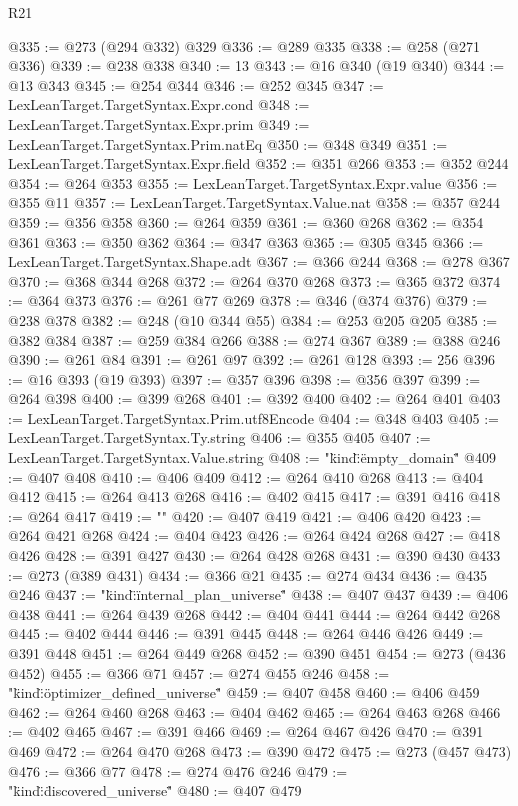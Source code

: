 \begin{lexlean}{R21}
\begin{coremodule}
@335 := @273 (@294 @332) @329
@336 := @289 @335
@338 := @258 (@271 @336)
@339 := @238 @338
@340 := 13
@343 := @16 @340 (@19 @340)
@344 := @13 @343
@345 := @254 @344
@346 := @252 @345
@347 := LexLeanTarget.TargetSyntax.Expr.cond
@348 := LexLeanTarget.TargetSyntax.Expr.prim
@349 := LexLeanTarget.TargetSyntax.Prim.natEq
@350 := @348 @349
@351 := LexLeanTarget.TargetSyntax.Expr.field
@352 := @351 @266
@353 := @352 @244
@354 := @264 @353
@355 := LexLeanTarget.TargetSyntax.Expr.value
@356 := @355 @11
@357 := LexLeanTarget.TargetSyntax.Value.nat
@358 := @357 @244
@359 := @356 @358
@360 := @264 @359
@361 := @360 @268
@362 := @354 @361
@363 := @350 @362
@364 := @347 @363
@365 := @305 @345
@366 := LexLeanTarget.TargetSyntax.Shape.adt
@367 := @366 @244
@368 := @278 @367
@370 := @368 @344 @268
@372 := @264 @370 @268
@373 := @365 @372
@374 := @364 @373
@376 := @261 @77 @269
@378 := @346 (@374 @376)
@379 := @238 @378
@382 := @248 (@10 @344 @55)
@384 := @253 @205 @205
@385 := @382 @384
@387 := @259 @384 @266
@388 := @274 @367
@389 := @388 @246
@390 := @261 @84
@391 := @261 @97
@392 := @261 @128
@393 := 256
@396 := @16 @393 (@19 @393)
@397 := @357 @396
@398 := @356 @397
@399 := @264 @398
@400 := @399 @268
@401 := @392 @400
@402 := @264 @401
@403 := LexLeanTarget.TargetSyntax.Prim.utf8Encode
@404 := @348 @403
@405 := LexLeanTarget.TargetSyntax.Ty.string
@406 := @355 @405
@407 := LexLeanTarget.TargetSyntax.Value.string
@408 := "{\"kind\":\"empty_domain\""
@409 := @407 @408
@410 := @406 @409
@412 := @264 @410 @268
@413 := @404 @412
@415 := @264 @413 @268
@416 := @402 @415
@417 := @391 @416
@418 := @264 @417
@419 := "}"
@420 := @407 @419
@421 := @406 @420
@423 := @264 @421 @268
@424 := @404 @423
@426 := @264 @424 @268
@427 := @418 @426
@428 := @391 @427
@430 := @264 @428 @268
@431 := @390 @430
@433 := @273 (@389 @431)
@434 := @366 @21
@435 := @274 @434
@436 := @435 @246
@437 := "{\"kind\":\"internal_plan_universe\""
@438 := @407 @437
@439 := @406 @438
@441 := @264 @439 @268
@442 := @404 @441
@444 := @264 @442 @268
@445 := @402 @444
@446 := @391 @445
@448 := @264 @446 @426
@449 := @391 @448
@451 := @264 @449 @268
@452 := @390 @451
@454 := @273 (@436 @452)
@455 := @366 @71
@457 := @274 @455 @246
@458 := "{\"kind\":\"optimizer_defined_universe\""
@459 := @407 @458
@460 := @406 @459
@462 := @264 @460 @268
@463 := @404 @462
@465 := @264 @463 @268
@466 := @402 @465
@467 := @391 @466
@469 := @264 @467 @426
@470 := @391 @469
@472 := @264 @470 @268
@473 := @390 @472
@475 := @273 (@457 @473)
@476 := @366 @77
@478 := @274 @476 @246
@479 := "{\"kind\":\"discovered_universe\""
@480 := @407 @479
}}}
\end{coremodule}
\end{lexlean}
